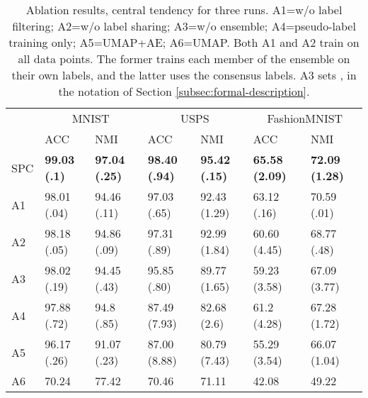 \documentclass[runningheads]{llncs}
\begin{document}
\begin{table*}[!t]
\medskip 
  \centering
  \footnotesize
  \begin{tabular}{@{}lllllll@{}}
    \toprule
    & \multicolumn{2}{c}{MNIST} & \multicolumn{2}{c}{USPS} & \multicolumn{2}{c}{FashionMNIST}        \\
    \cmidrule(r){2-3}  \cmidrule(r){4-5}  \cmidrule(r){6-7}
    & ACC & NMI & ACC & NMI & ACC & NMI \\
    \midrule
    
    SPC& \textbf{99.03 (.1)} & \textbf{97.04 (.25)} & \textbf{98.40 (.94)} & \textbf{95.42 (.15)} & \textbf{65.58 (2.09)} & \textbf{72.09 (1.28)} \\ 
    
    \midrule
   
    A1 & 98.01 (.04) & 94.46 (.11) & 97.03 (.65) & 92.43 (1.29) & 63.12 (.16) & 70.59 (.01) \\
    
    A2 & 98.18 (.05) & 94.86 (.09) & 97.31 (.89) & 92.99 (1.84) & 60.60 (4.45) & 68.77 (.48) \\
    
    A3 & 98.02 (.19) & 94.45 (.43) & 95.85 (.80) & 89.77 (1.65) & 59.23 (3.58) & 67.09 (3.77) \\
    
    A4 & 97.88 (.72) & 94.8 (.85) & 87.49 (7.93) & 82.68 (2.6) & 61.2 (4.28) & 67.28 (1.72) \\
    
    A5 & 96.17 (.26) & 91.07 (.23) & 87.00 (8.88) & 80.79 (7.43) & 55.29 (3.54) & 66.07 (1.04) \\
    
    A6 & 70.24 & 77.42 & 70.46 & 71.11 & 42.08 & 49.22 \\
     
   \bottomrule
  \end{tabular}
  \vspace{2ex}
  \caption{ \footnotesize Ablation results, central tendency for three runs. A1=w/o label filtering; A2=w/o label sharing; A3=w/o ensemble; A4=pseudo-label training only; A5=UMAP+AE; A6=UMAP. Both A1 and A2 train on all data points. The former trains each member of the ensemble on their own labels, and the latter uses the consensus labels. A3 sets , in the notation of Section \ref{subsec:formal-description}.} \label{tab:ablation-results}
 \vspace{-4ex}
\end{table*}
\end{document}
